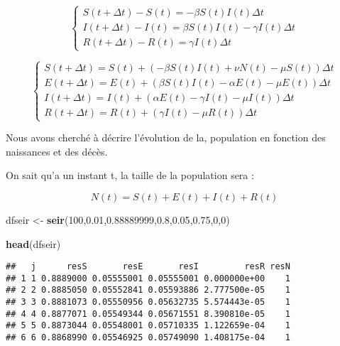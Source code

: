 \documentclass[
]{article}
\newenvironment{Shaded}{\begin{snugshade}}{\end{snugshade}}
\newcommand{\DecValTok}[1]{\textcolor[rgb]{0.00,0.00,0.81}{#1}}
\newcommand{\FloatTok}[1]{\textcolor[rgb]{0.00,0.00,0.81}{#1}}
\newcommand{\KeywordTok}[1]{\textcolor[rgb]{0.13,0.29,0.53}{\textbf{#1}}}
\newcommand{\NormalTok}[1]{#1}
\newcommand{\StringTok}[1]{\textcolor[rgb]{0.31,0.60,0.02}{#1}}
\begin{document}
\[\begin{equation}
    \left\{
     \begin{array}{l}
        S(t + \Delta t) -S(t) = - \beta S(t)  I(t) \Delta t\\
        I(t + \Delta t) -I(t) = \beta S(t)  I(t) - \gamma  I(t) \Delta t\\
        R(t + \Delta t) -R(t) = \gamma I(t) \Delta t
      \end{array}
    \right.
\end{equation}\]

\[\begin{equation}
    \left\{
     \begin{array}{l}
        S(t + \Delta t)  = S(t) + (- \beta S(t) I(t) + \nu N(t) - \mu S(t)) \Delta t\\
        E(t + \Delta t)  = E(t) + ( \beta S(t) I(t) - \alpha E(t) - \mu E(t)) \Delta t\\
        I(t + \Delta t)  = I(t) + ( \alpha E(t) - \gamma I(t) - \mu I(t)) \Delta t\\
        R(t + \Delta t)  = R(t) + (\gamma I(t) - \mu R(t)) \Delta t
      \end{array}
    \right.
\end{equation}\]

Nous avons cherché à décrire l'évolution de la, population en fonction
des naissances et des décès.

On sait qu'a un instant t, la taille de la population sera :

\[N(t)=S(t)+E(t)+I(t)+R(t)\]

\begin{Shaded}
\begin{Highlighting}[]
\NormalTok{dfseir <-}\StringTok{ }\KeywordTok{seir}\NormalTok{(}\DecValTok{100}\NormalTok{,}\FloatTok{0.01}\NormalTok{,}\FloatTok{0.88889999}\NormalTok{,}\FloatTok{0.8}\NormalTok{,}\FloatTok{0.05}\NormalTok{,}\FloatTok{0.75}\NormalTok{,}\DecValTok{0}\NormalTok{,}\DecValTok{0}\NormalTok{)}

\KeywordTok{head}\NormalTok{(dfseir)}
\end{Highlighting}
\end{Shaded}

\begin{verbatim}
##   j      resS       resE       resI         resR resN
## 1 1 0.8889000 0.05555001 0.05555001 0.000000e+00    1
## 2 2 0.8885050 0.05552841 0.05593886 2.777500e-05    1
## 3 3 0.8881073 0.05550956 0.05632735 5.574443e-05    1
## 4 4 0.8877071 0.05549344 0.05671551 8.390810e-05    1
## 5 5 0.8873044 0.05548001 0.05710335 1.122659e-04    1
## 6 6 0.8868990 0.05546925 0.05749090 1.408175e-04    1
\end{verbatim}
\end{document}
